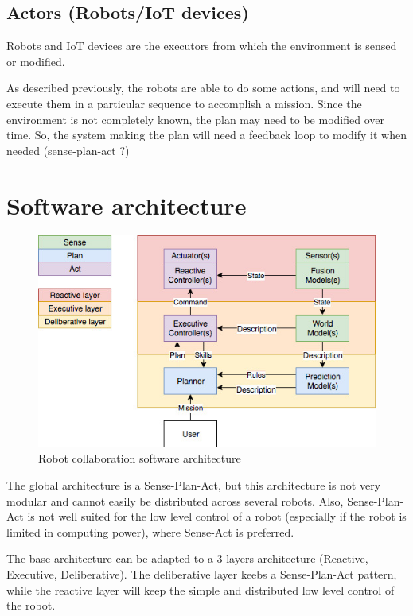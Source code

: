 \documentclass[conference]{IEEEtran}
\begin{document}
\subsection{Actors (Robots/IoT devices)}

Robots and IoT devices are the executors from which the environment is sensed or modified.

As described previously, the robots are able to do some actions, and will need to execute them in a particular sequence to accomplish a mission.
Since the environment is not completely known, the plan may need to be modified over time.
So, the system making the plan will need a feedback loop to modify it when needed (sense-plan-act ?)

\section{Software architecture}

\begin{figure}
  \centering
  \caption{\label{3layers}Robot collaboration software architecture}
  \includegraphics[scale=0.40]{img/3layers}
\end{figure}

The global architecture is a Sense-Plan-Act, but this architecture is not very modular and cannot easily be distributed across several robots.
Also, Sense-Plan-Act is not well suited for the low level control of a robot (especially if the robot is limited in computing power), where Sense-Act is preferred.

The base architecture can be adapted to a 3 layers architecture (Reactive, Executive, Deliberative).
The deliberative layer keebs a Sense-Plan-Act pattern, while the reactive layer will keep the simple and distributed low level control of the robot.
\end{document}
